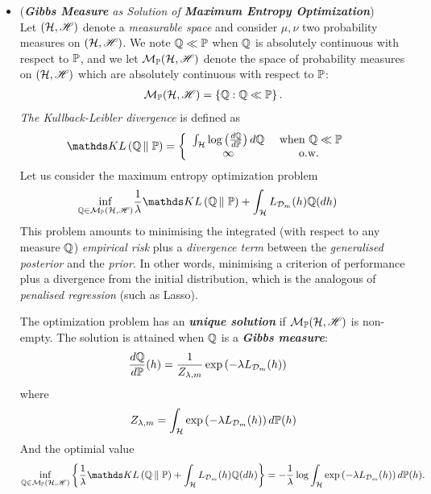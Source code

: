 \documentclass[11pt]{article}
\begin{document}
\begin{itemize}
\item \begin{remark}(\emph{\textbf{Gibbs Measure} as Solution of \textbf{Maximum Entropy Optimization}})\\
Let $({\mathcal H}, {\mathscr H})$ denote a \emph{measurable space} and consider $\mu, \nu$ two probability measures on $({\mathcal H}, {\mathscr H})$. We note ${\mathbb Q} \ll {\mathbb P}$ when ${\mathbb Q}$ is absolutely continuous with respect to ${\mathbb P}$, and we let ${\mathcal M}_{{\mathbb P}}({\mathcal H}, {\mathscr H})$ denote the space of probability measures on $({\mathcal H}, {\mathscr H})$ which are absolutely continuous with respect to ${\mathbb P}$:
\begin{align*}
{\mathcal M}_{{\mathbb P}}({\mathcal H}, {\mathscr H})= \left\{{\mathbb Q}: {\mathbb Q} \ll {\mathbb P}\right\}.
\end{align*} \emph{The Kullback-Leibler divergence} is defined as
\begin{align*}
\kl{\bQ}{\bP} &= \left\{\begin{array}{cc}
\int_{\cH}\log\paren{\frac{d\bQ}{d\bP}}d\bQ & \text{ when }\bQ \ll \bP\\
\infty &\text{o.w.}
\end{array}
\right.
\end{align*} Let us consider the maximum entropy optimization problem
\begin{align}
\inf_{\bQ \in \cM_{\bP}(\cH, \srH)} & \frac{1}{\lambda}\kl{\bQ}{\bP} + \int_{\cH}L_{\cD_{m}}(h) \bQ(dh)  \label{eqn: max_ent}
\end{align} This problem amounts to minimising the integrated (with respect to any measure ${\mathbb Q}$) \emph{empirical risk} plus a \emph{divergence term} between the \emph{generalised posterior} and the \emph{prior}. In other words, minimising a criterion of performance plus a divergence from the initial distribution, which is the analogous of \emph{penalised regression} (such as Lasso).

The optimization problem has an \emph{\textbf{unique solution}} if ${\mathcal M}_{{\mathbb P}}({\mathcal H}, {\mathscr H})$ is non-empty. The solution is attained when ${\mathbb Q}$ is a \emph{\textbf{Gibbs measure}}:
\begin{align}
\frac{d{\mathbb Q}}{d{\mathbb P}}(h) &= \frac{1}{Z_{\lambda, m}}\exp\left(- \lambda L_{{\mathcal D}_{m}}(h)\right) \label{eqn: gibbs_max_ent}
\end{align} where 
\begin{align*}
Z_{\lambda, m} = \int_{{\mathcal H}}\exp\left(- \lambda L_{{\mathcal D}_{m}}(h)\right) d{\mathbb P}(h)
\end{align*} And the optimial value 
\begin{align}
\inf_{\bQ \in \cM_{\bP}(\cH, \srH)}\set{\frac{1}{\lambda}\kl{\bQ}{\bP} + \int_{\cH}L_{\cD_{m}}(h) \bQ(dh) } = -\frac{1}{\lambda}\log \int_{\cH}\exp\paren{- \lambda L_{\cD_{m}}(h)} d\bP(h). \label{eqn: gibbs_max_ent_opt_value}
\end{align}
\end{remark}
\end{itemize}
\end{document}
